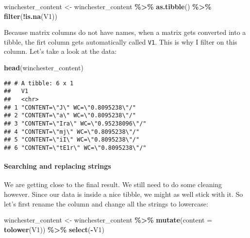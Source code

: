 \documentclass[
]{article}
\newenvironment{Shaded}{\begin{snugshade}}{\end{snugshade}}
\newcommand{\DataTypeTok}[1]{\textcolor[rgb]{0.13,0.29,0.53}{#1}}
\newcommand{\KeywordTok}[1]{\textcolor[rgb]{0.13,0.29,0.53}{\textbf{#1}}}
\newcommand{\NormalTok}[1]{#1}
\newcommand{\OperatorTok}[1]{\textcolor[rgb]{0.81,0.36,0.00}{\textbf{#1}}}
\newcommand{\StringTok}[1]{\textcolor[rgb]{0.31,0.60,0.02}{#1}}
\begin{document}
\begin{Shaded}
\begin{Highlighting}[]
\NormalTok{winchester\_content \textless{}{-}}\StringTok{ }\NormalTok{winchester\_content }\OperatorTok{\%\textgreater{}\%}
\StringTok{  }\KeywordTok{as.tibble}\NormalTok{() }\OperatorTok{\%\textgreater{}\%}
\StringTok{  }\KeywordTok{filter}\NormalTok{(}\OperatorTok{!}\KeywordTok{is.na}\NormalTok{(V1))}
\end{Highlighting}
\end{Shaded}

Because matrix columns do not have names, when a matrix gets converted into a tibble, the firt column
gets automatically called \texttt{V1}. This is why I filter on this column. Let's take a look at the data:

\begin{Shaded}
\begin{Highlighting}[]
\KeywordTok{head}\NormalTok{(winchester\_content)}
\end{Highlighting}
\end{Shaded}

\begin{verbatim}
## # A tibble: 6 x 1
##   V1                                  
##   <chr>                               
## 1 "CONTENT=\"J\" WC=\"0.8095238\"/"   
## 2 "CONTENT=\"a\" WC=\"0.8095238\"/"   
## 3 "CONTENT=\"Ira\" WC=\"0.95238096\"/"
## 4 "CONTENT=\"mj\" WC=\"0.8095238\"/"  
## 5 "CONTENT=\"iI\" WC=\"0.8095238\"/"  
## 6 "CONTENT=\"tE1r\" WC=\"0.8095238\"/"
\end{verbatim}

\hypertarget{searching-and-replacing-strings}{%
\paragraph{Searching and replacing strings}\label{searching-and-replacing-strings}}

We are getting close to the final result. We still need to do some cleaning however. Since our data
is inside a nice tibble, we might as well stick with it. So let's first rename the column and
change all the strings to lowercase:

\begin{Shaded}
\begin{Highlighting}[]
\NormalTok{winchester\_content \textless{}{-}}\StringTok{ }\NormalTok{winchester\_content }\OperatorTok{\%\textgreater{}\%}\StringTok{ }
\StringTok{  }\KeywordTok{mutate}\NormalTok{(}\DataTypeTok{content =} \KeywordTok{tolower}\NormalTok{(V1)) }\OperatorTok{\%\textgreater{}\%}\StringTok{ }
\StringTok{  }\KeywordTok{select}\NormalTok{(}\OperatorTok{{-}}\NormalTok{V1)}
\end{Highlighting}
\end{Shaded}
\end{document}
